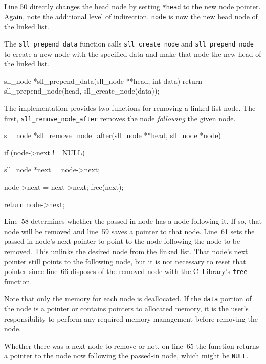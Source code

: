 \documentclass{article}
\begin{document}
  Line 50 directly changes the head node by setting \verb|*head| to the new node pointer. Again, note the additional level of indirection. \verb|node| is now the new head node of the linked list.

  The \verb|sll_prepend_data| function calls \verb|sll_create_node| and \verb|sll_prepend_node| to create a new node with the specified data and make that node the new head of the linked list.
  \begin{lstc}
sll_node *sll_prepend_data(sll_node **head, int data) {
  return sll_prepend_node(head, sll_create_node(data));
}\end{lstc}

  The implementation provides two functions for removing a linked list node. The first, \verb|sll_remove_node_after| removes the node \emph{following} the given node.
  \begin{lstc}
sll_node *sll_remove_node_after(sll_node **head, sll_node *node) {
  if (node->next != NULL) {
    sll_node *next = node->next;

    node->next = next->next;
    free(next);
  }

  return node->next;
}\end{lstc}
  Line~58 determines whether the passed-in node has a node following it. If so, that node will be removed and line~59 saves a pointer to that node. Line~61 sets the passed-in node's next pointer to point to the node following the node to be removed. This unlinks the desired node from the linked list. That node's next pointer still points to the following node, but it is not necessary to reset that pointer since line~66 disposes of the removed node with the C~Library's \verb|free| function.

  Note that only the memory for each node is deallocated. If the \verb|data| portion of the node is a pointer or contains pointers to allocated memory, it is the user's responsibility to perform any required memory management before removing the node.

  Whether there was a next node to remove or not, on line~65 the function returns a pointer to the node now following the passed-in node, which might be \verb|NULL|.
\end{document}
